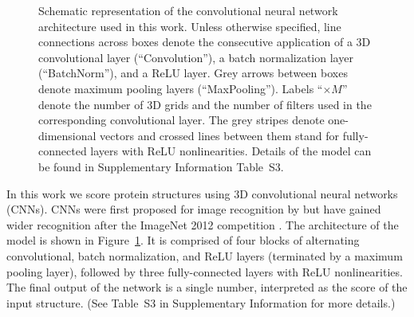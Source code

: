 \documentclass{bioinfo}
\begin{document}
\begin{figure}[t]
    \centerline{}
%
    \vspace{-10pt}
    \caption{Schematic representation of the convolutional neural
    network architecture used in this work. Unless otherwise specified, line connections across
    boxes denote the consecutive application of a 3D convolutional
    layer (``Convolution''), a batch normalization layer
    (``BatchNorm''), and a ReLU layer. Grey arrows between boxes denote
    maximum pooling layers (``MaxPooling''). Labels ``$\times M$''
    denote the number of 3D grids and the number of filters used in the corresponding
    convolutional layer.
    The grey stripes denote
    one-dimensional vectors and crossed lines between them stand for
    fully-connected layers with ReLU nonlinearities. Details of the
    model can be found in Supplementary Information Table~S3.}
    \label{Fig:CNNModel}
\end{figure}

In this work we score protein structures using 3D convolutional neural
networks (CNNs). CNNs were first proposed for image recognition by
\citealp{lecun1989backpropagation} but have gained wider
recognition after the ImageNet 2012 competition
\citep{krizhevsky2012imagenet}. The architecture of the model is shown
in Figure~\ref{Fig:CNNModel}.  It is comprised of four blocks of
alternating convolutional, batch normalization, and ReLU layers
(terminated by a maximum pooling layer), followed by three
fully-connected layers with ReLU nonlinearities. The final output of
the network is a single number, interpreted as the score of the input
structure. (See Table~S3 in Supplementary Information for more
details.)
\end{document}

